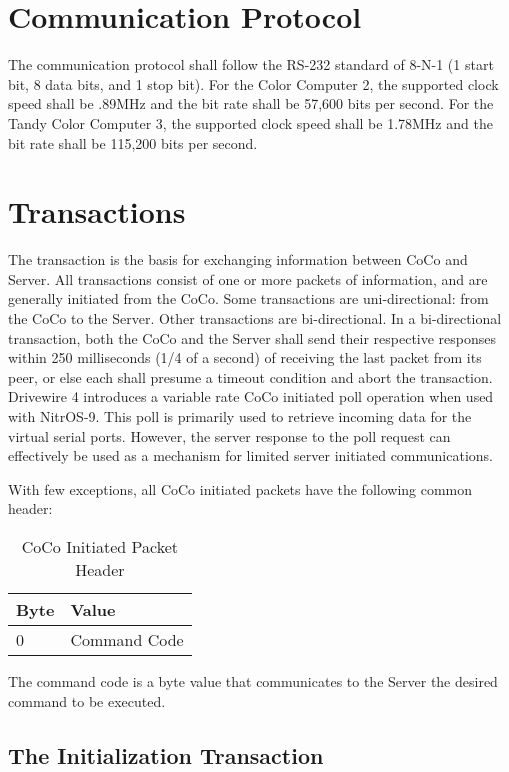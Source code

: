 \documentclass{article}
\begin{document}
\section{Communication Protocol}

The communication protocol shall follow the RS-232 standard of 8-N-1 (1 start bit, 8 data bits, and 1 stop bit). For the Color Computer 2, the supported clock speed shall be .89MHz and the bit rate shall be 57,600 bits per second. For the Tandy Color Computer 3, the supported clock speed shall be 1.78MHz and the bit rate shall be 115,200 bits per second.

\section{Transactions}

The transaction is the basis for exchanging information between CoCo and Server.	 All transactions consist of one or more packets of information, and are generally initiated from the CoCo.
Some transactions are uni-directional: from the CoCo to the Server.	Other transactions are bi-directional. In a bi-directional transaction, both the CoCo and the Server shall send their respective responses within 250 milliseconds (1/4 of a second) of receiving the last packet from its peer, or else each shall presume a timeout condition and abort the transaction.  Drivewire 4 introduces a variable rate CoCo initiated poll operation when used with NitrOS-9.   This poll is primarily used to retrieve incoming data for the virtual serial ports.  However, the server response to the poll request can effectively be used as a mechanism for limited server initiated communications.


With few exceptions, all CoCo initiated packets have the following common header:

\begin{table}[ht]
\caption{CoCo Initiated Packet Header}
\begin{center}
\begin{tabular}{|ll|}
\hline
Byte & Value \\ \hline
0 & Command Code \\
\hline
\end{tabular}
\end{center}
\end{table}

The command code is a byte value that communicates to the Server the desired command to be executed.

\subsection{The Initialization Transaction}
\end{document}
